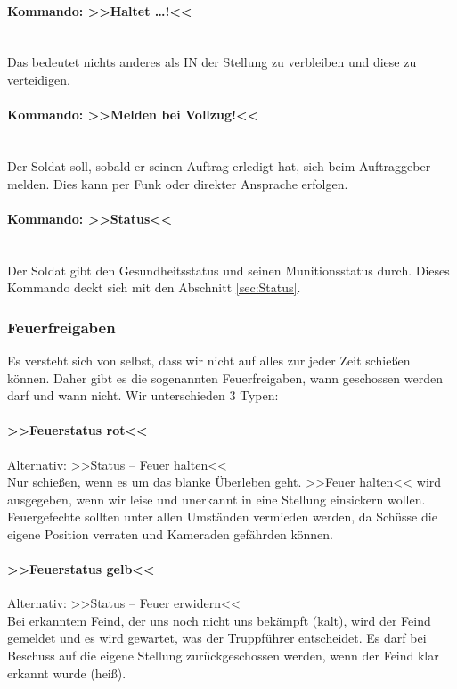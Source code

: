 \paragraph*{Kommando: >>Haltet \dots!<<}\hfil\\
	Das bedeutet nichts anderes als IN der Stellung zu verbleiben und diese zu verteidigen.

\paragraph*{Kommando: >>Melden bei Vollzug!<<}\hfil\\
	Der Soldat soll, sobald er seinen Auftrag erledigt hat, sich beim Auftraggeber melden. Dies kann per Funk oder direkter Ansprache erfolgen.

\paragraph*{Kommando: >>Status<<}\hfil\\
	Der Soldat gibt den Gesundheitsstatus und seinen Munitionsstatus durch. Dieses Kommando deckt sich mit den Abschnitt \ref{sec:Status}.

\subsubsection{Feuerfreigaben}
	Es versteht sich von selbst, dass wir nicht auf alles zur jeder Zeit schießen können. Daher gibt es die sogenannten Feuerfreigaben, wann geschossen werden darf und wann nicht. Wir unterschieden 3 Typen:

\paragraph*{>>Feuerstatus rot<<}
	Alternativ: >>Status -- Feuer halten<<\hfil\\
	Nur schießen, wenn es um das blanke Überleben geht. >>Feuer halten<< wird ausgegeben, wenn wir leise und unerkannt in eine Stellung einsickern wollen. Feuergefechte sollten unter allen Umständen vermieden werden, da Schüsse die eigene Position verraten und Kameraden gefährden können.

\paragraph*{>>Feuerstatus gelb<<}
	Alternativ: >>Status -- Feuer erwidern<<\hfil\\
	Bei erkanntem Feind, der uns noch nicht uns bekämpft (kalt), wird der Feind gemeldet und es wird gewartet, was der Truppführer entscheidet. Es darf bei Beschuss auf die eigene Stellung zurückgeschossen werden, wenn der Feind klar erkannt wurde (heiß).

